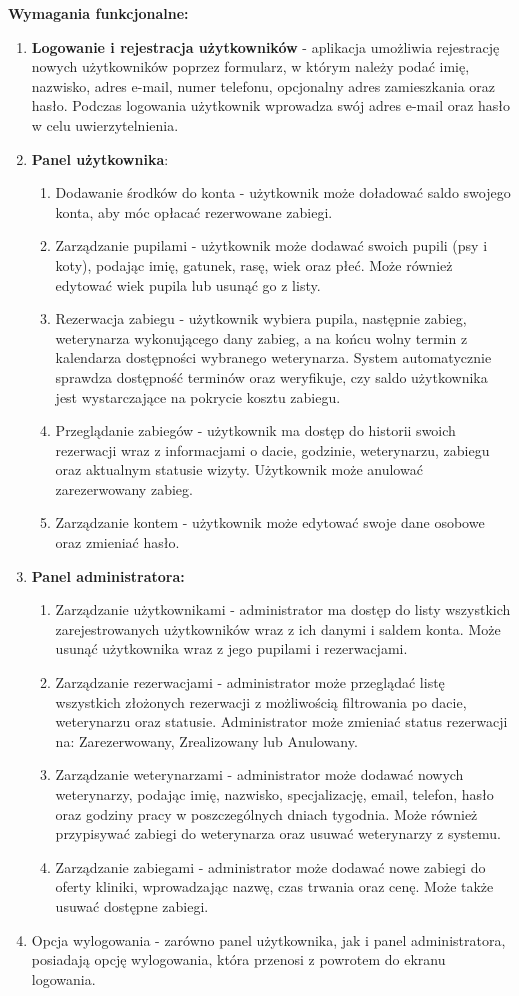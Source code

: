 \textbf{Wymagania funkcjonalne:}
\begin{enumerate}
\item \textbf{Logowanie i rejestracja użytkowników} - aplikacja umożliwia rejestrację nowych użytkowników poprzez formularz, w którym należy podać imię, nazwisko, adres e-mail, numer telefonu, opcjonalny adres zamieszkania oraz hasło. Podczas logowania użytkownik wprowadza swój adres e-mail oraz hasło w celu uwierzytelnienia.

\item \textbf{Panel użytkownika}:
\begin{enumerate}
\item Dodawanie środków do konta - użytkownik może doładować saldo swojego konta, aby móc opłacać rezerwowane zabiegi.
\item Zarządzanie pupilami - użytkownik może dodawać swoich pupili (psy i koty), podając imię, gatunek, rasę, wiek oraz płeć. Może również edytować wiek pupila lub usunąć go z listy.
\item Rezerwacja zabiegu - użytkownik wybiera pupila, następnie zabieg, weterynarza wykonującego dany zabieg, a na końcu wolny termin z kalendarza dostępności wybranego weterynarza. System automatycznie sprawdza dostępność terminów oraz weryfikuje, czy saldo użytkownika jest wystarczające na pokrycie kosztu zabiegu.
\item Przeglądanie zabiegów - użytkownik ma dostęp do historii swoich rezerwacji wraz z informacjami o dacie, godzinie, weterynarzu, zabiegu oraz aktualnym statusie wizyty. Użytkownik może anulować zarezerwowany zabieg.
\item Zarządzanie kontem - użytkownik może edytować swoje dane osobowe oraz zmieniać hasło.
\end{enumerate}

\item \textbf{Panel administratora:}
\begin{enumerate}
\item Zarządzanie użytkownikami - administrator ma dostęp do listy wszystkich zarejestrowanych użytkowników wraz z ich danymi i saldem konta. Może usunąć użytkownika wraz z jego pupilami i rezerwacjami.
\item Zarządzanie rezerwacjami - administrator może przeglądać listę wszystkich złożonych rezerwacji z możliwością filtrowania po dacie, weterynarzu oraz statusie. Administrator może zmieniać status rezerwacji na: Zarezerwowany, Zrealizowany lub Anulowany.
\item Zarządzanie weterynarzami - administrator może dodawać nowych weterynarzy, podając imię, nazwisko, specjalizację, email, telefon, hasło oraz godziny pracy w poszczególnych dniach tygodnia. Może również przypisywać zabiegi do weterynarza oraz usuwać weterynarzy z systemu.
\item Zarządzanie zabiegami - administrator może dodawać nowe zabiegi do oferty kliniki, wprowadzając nazwę, czas trwania oraz cenę. Może także usuwać dostępne zabiegi.
\end{enumerate}
\item Opcja wylogowania - zarówno panel użytkownika, jak i panel administratora, posiadają opcję wylogowania, która przenosi z powrotem do ekranu logowania.
\end{enumerate}
